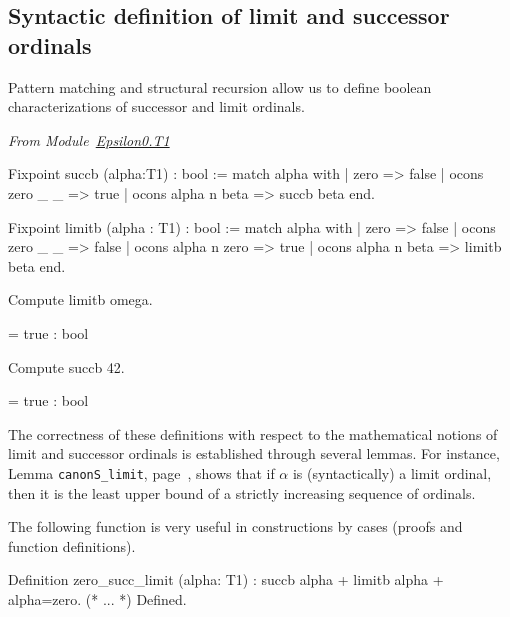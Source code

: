 \subsection{Syntactic definition of limit and successor ordinals}

Pattern matching and structural recursion allow us to define boolean characterizations  of successor and limit ordinals.


\vspace{4pt}
\noindent
\emph{From Module~\href{../theories/html/hydras.Epsilon0.T1.html\#succb}{Epsilon0.T1}}

\begin{Coqsrc}
Fixpoint succb (alpha:T1) : bool :=
  match alpha with
    | zero => false
    | ocons zero _ _ => true
    | ocons alpha n beta => succb beta
  end.

Fixpoint limitb (alpha : T1) : bool :=
  match alpha with
    | zero => false
    | ocons zero _ _ => false
    | ocons alpha n zero => true
    | ocons alpha n beta => limitb beta
  end.
\end{Coqsrc}



\begin{Coqsrc}
  Compute limitb omega.
\end{Coqsrc}

\begin{Coqanswer}
  = true
     : bool
\end{Coqanswer}

\begin{Coqsrc}
Compute succb 42.
\end{Coqsrc}

\begin{Coqanswer}
  = true
     : bool
\end{Coqanswer}

The correctness of these definitions with respect to the mathematical notions of
limit and successor ordinals is established through several lemmas. For instance,
Lemma \texttt{canonS\_limit}, page~\pageref{lemma:canonS-limit}, shows that
if $\alpha$ is (syntactically) a limit ordinal, then it is the least upper bound of
a strictly increasing sequence of ordinals.


   The following function is very useful in constructions by cases (proofs and function definitions).
   
\begin{Coqsrc}
Definition zero_succ_limit (alpha: T1) :
    {succb alpha} + {limitb alpha} +  {alpha=zero}.
    (* ... *)
Defined.
\end{Coqsrc}



